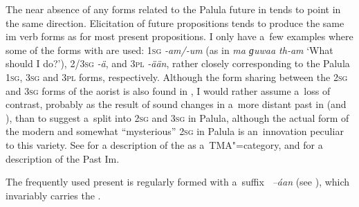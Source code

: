 The near absence of any forms related to the Palula future in  tends to point in the same direction. Elicitation of future propositions tends to produce the same im verb forms as for most present  propositions. I only have a~few examples where some of the forms with  are used: \textsc{1sg} \textit{-am/-um} (as in \textit{ma ɡuwaa th-am} `What should I do?'), \textsc{2/3sg} \textit{-ä}, and \textsc{3pl} \textit{-ään}, rather closely corresponding to the Palula \textsc{1sg}, \textsc{3sg} and \textsc{3pl} forms, respectively. Although the form sharing between the \textsc{2sg} and \textsc{3sg} forms of the aorist is also found in   \citep[39]{schmidt2004}, I would rather assume a~loss of contrast, probably as the result of sound changes in a~more distant past in  (and  ), than to suggest a~split into \textsc{2sg} and \textsc{3sg} in Palula, although the actual form of the modern and somewhat ``mysterious'' \textsc{2sg} in Palula is an~innovation peculiar to this  variety. See  for a description of the  as a~TMA"=category, and  for a description of the Past Im.


 The frequently used present  is regularly formed with a~suffix
\textit{~--áan} (see ), which invariably carries the .


